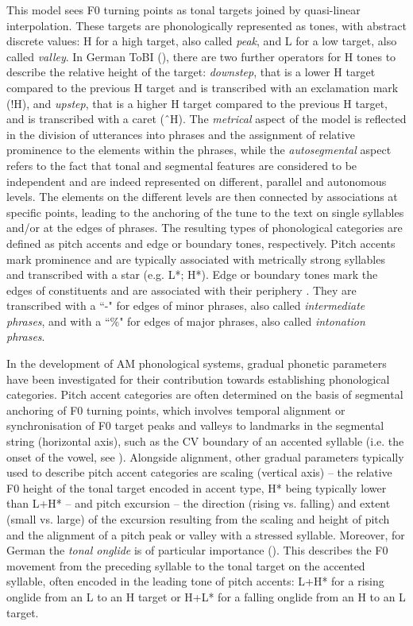 This model sees F0 turning points as tonal targets joined by quasi-linear interpolation. These targets are phonologically represented as tones, with abstract discrete values: H for a high target, also called \textit{peak}, and L for a low target, also called \textit{valley}. In German ToBI (\citealt{GriceEtAl2005}), there are two further operators for H tones to describe the relative height of the target: \textit{downstep}, that is a lower H target compared to the previous H target and is transcribed with an exclamation mark (!H), and \textit{upstep}, that is a higher H target compared to the previous H target, and is transcribed with a caret (ˆH). The \textit{metrical} aspect of the model is reflected in the division of utterances into phrases and the assignment of relative prominence to the elements within the phrases, while the \textit{autosegmental} aspect refers to the fact that tonal and segmental features are considered to be independent and are indeed represented on different, parallel and autonomous levels. The elements on the different levels are then connected by associations at specific points, leading to the anchoring of the tune to the text on single syllables and/or at the edges of phrases. The resulting types of phonological categories are defined as pitch accents and edge or boundary tones, respectively. Pitch accents mark prominence and are typically associated with metrically strong syllables and transcribed with a star (e.g. L*; H*). Edge or boundary tones mark the edges of constituents and are associated with their periphery \citep{GriceEtAl2005}. They are transcribed with a ``-" for edges of minor phrases, also called \textit{intermediate phrases}, and with a ``\%" for edges of major phrases, also called \textit{intonation phrases}.

In the development of AM phonological systems, gradual phonetic parameters have been investigated for their contribution towards establishing phonological categories. Pitch accent categories are often determined on the basis of segmental anchoring of F0 turning points, which involves temporal alignment or synchronisation of F0 target peaks and valleys to landmarks in the segmental string (horizontal axis), such as the \textsc{CV} boundary of an accented syllable (i.e. the onset of the vowel, see \citealt{LaddMennen1998}). Alongside alignment, other gradual parameters typically used to describe pitch accent categories are scaling (vertical axis) – the relative F0 height of the tonal target encoded in accent type, H* being typically lower than L+H* – and pitch excursion – the direction (rising vs. falling) and extent (small vs. large) of the excursion resulting from the scaling and height of pitch and the alignment of a pitch peak or valley with a stressed syllable. Moreover, for German the \textit{tonal onglide} is of particular importance (\citealt{RitterGrice2015}). This describes the F0 movement from the preceding syllable to the tonal target on the accented syllable, often encoded in the leading tone of pitch accents: L+H* for a rising onglide from an L to an H target or H+L* for a falling onglide from an H to an L target.

